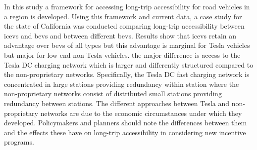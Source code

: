 \documentclass[11pt]{article}
\begin{document}
\begin{multicols}{2}
In this study a framework for accessing long-trip accessibility for road vehicles in a region is developed. Using this framework and current data, a case study for the state of California was conducted comparing long-trip accessibility between \glspl{icev} and \glspl{bev} and between different \glspl{bev}. Results show that \glspl{icev} retain an advantage over \glspl{bev} of all types but this advantage is marginal for Tesla vehicles but major for low-end non-Tesla vehicles. the major difference is access to the Tesla DC charging network which is larger and differently structured compared to the non-proprietary networks. Specifically, the Tesla DC fast charging network is concentrated in large stations providing redundancy within station where the non-proprietary networks consist of distributed small stations providing redundancy between stations. The different approaches between Tesla and non-proprietary networks are due to the economic circumstances under which they developed. Policymakers and planners should note the differences between them and the effects these have on long-trip accessibility in considering new incentive programs.


 

\newpage

\printbibliography

\end{multicols}
\end{document}
